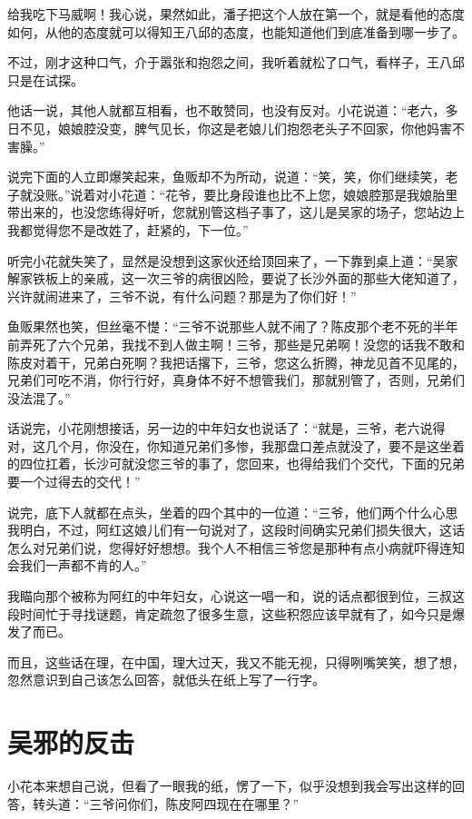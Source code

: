 给我吃下马威啊！我心说，果然如此，潘子把这个人放在第一个，就是看他的态度如何，从他的态度就可以得知王八邱的态度，也能知道他们到底准备到哪一步了。

不过，刚才这种口气，介于嚣张和抱怨之间，我听着就松了口气，看样子，王八邱只是在试探。

他话一说，其他人就都互相看，也不敢赞同，也没有反对。小花说道：“老六，多日不见，娘娘腔没变，脾气见长，你这是老娘儿们抱怨老头子不回家，你他妈害不害臊。”

说完下面的人立即爆笑起来，鱼贩却不为所动，说道：“笑，笑，你们继续笑，老子就没账。”说着对小花道：“花爷，要比身段谁也比不上您，娘娘腔那是我娘胎里带出来的，也没您练得好听，您就别管这档子事了，这儿是吴家的场子，您站边上我都觉得您不是改姓了，赶紧的，下一位。”

听完小花就失笑了，显然是没想到这家伙还给顶回来了，一下靠到桌上道：“吴家解家铁板上的亲戚，这一次三爷的病很凶险，要说了长沙外面的那些大佬知道了，兴许就闹进来了，三爷不说，有什么问题？那是为了你们好！”

鱼贩果然也笑，但丝毫不憷：“三爷不说那些人就不闹了？陈皮那个老不死的半年前弄死了六个兄弟，我找不到人做主啊！三爷，那些是兄弟啊！没您的话我不敢和陈皮对着干，兄弟白死啊？我把话撂下，三爷，您这么折腾，神龙见首不见尾的，兄弟们可吃不消，你行行好，真身体不好不想管我们，那就别管了，否则，兄弟们没法混了。”

话说完，小花刚想接话，另一边的中年妇女也说话了：“就是，三爷，老六说得对，这几个月，你没在，你知道兄弟们多惨，我那盘口差点就没了，要不是这坐着的四位扛着，长沙可就没您三爷的事了，您回来，也得给我们个交代，下面的兄弟要一个过得去的交代！”

说完，底下人就都在点头，坐着的四个其中的一位道：“三爷，他们两个什么心思我明白，不过，阿红这娘儿们有一句说对了，这段时间确实兄弟们损失很大，这话怎么对兄弟们说，您得好好想想。我个人不相信三爷您是那种有点小病就吓得连知会我们一声都不肯的人。”

我瞄向那个被称为阿红的中年妇女，心说这一唱一和，说的话点都很到位，三叔这段时间忙于寻找谜题，肯定疏忽了很多生意，这些积怨应该早就有了，如今只是爆发了而已。

而且，这些话在理，在中国，理大过天，我又不能无视，只得咧嘴笑笑，想了想，忽然意识到自己该怎么回答，就低头在纸上写了一行字。

\chapter{吴邪的反击}

小花本来想自己说，但看了一眼我的纸，愣了一下，似乎没想到我会写出这样的回答，转头道：“三爷问你们，陈皮阿四现在在哪里？”

